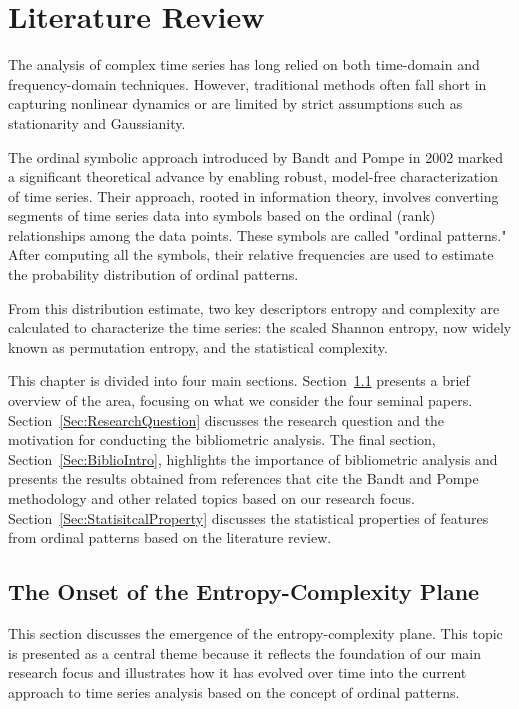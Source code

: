 \chapter{Literature Review}\label{C:lit}

The analysis of complex time series has long relied on both time-domain and frequency-domain techniques. 
However, traditional methods often fall short in capturing nonlinear dynamics or are limited by strict assumptions such as stationarity and Gaussianity. 

The ordinal symbolic approach introduced by Bandt and Pompe in 2002 marked a significant theoretical advance by enabling robust, model-free characterization of time series. 
Their approach, rooted in information theory, involves converting segments of time series data into symbols based on the ordinal (rank) relationships among the data points.
These symbols are called "ordinal patterns." After computing all the symbols, their relative frequencies are used to estimate the probability distribution of ordinal patterns.

From this distribution estimate, two key descriptors entropy and complexity are calculated to characterize the time series: the scaled Shannon entropy, now widely known as permutation entropy, and the statistical complexity.

This chapter is divided into four main sections. Section~\ref{Sec:Onset} presents a brief overview of the area, focusing on what we consider the four seminal papers. Section~\ref{Sec:ResearchQuestion} discusses the research question and the motivation for conducting the bibliometric analysis. The final section, Section~\ref{Sec:BiblioIntro}, highlights the importance of bibliometric analysis and presents the results obtained from references that cite the Bandt and Pompe methodology and other related topics based on our research focus. 
Section~\ref{Sec:StatisitcalProperty} discusses the statistical properties of features from ordinal patterns based on the literature review.   


\section{The Onset of the Entropy-Complexity Plane}\label{Sec:Onset}

This section discusses the emergence of the entropy-complexity plane. This topic is presented as a central theme because it reflects the foundation of our main research focus and illustrates how it has evolved over time into the current approach to time series analysis based on the concept of ordinal patterns. 

